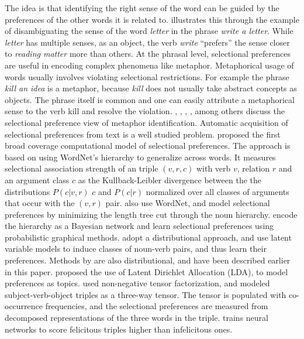 The idea is that identifying the right sense of the word can be guided by the 
preferences of the other words it is related to.  \cite{resnik1997selectional}
illustrates this through the example of disambiguating the sense of the word 
\textit{letter} in the phrase \textit{write a letter}.
While \textit{letter} has multiple senses, as an object, the verb \textit{write} 
``prefers'' the sense closer to \textit{reading matter} more than others.
At the phrasal level, selectional preferences are useful in encoding complex 
phenomena like metaphor.  Metaphorical usage of words usually involves violating 
selectional restrictions.
For example the phrase \textit{kill an idea} is a metaphor, because 
\textit{kill} does not usually take abstract concepts as objects.  The phrase 
itself is common and
one can easily attribute a metaphorical sense to the verb kill and resolve the 
violation.  \cite{wilks2007making}, \cite{wilks2007preferential}, 
\cite{krishnakumaran2007hunting},
\cite{shutova2013statistical}, among others discuss the selectional preference 
view of metaphor identification.
Automatic acquisition of selectional preferences from text is a well studied 
problem.  \cite{resnik1996selectional} proposed the first broad coverage 
computational model of selectional preferences.  The approach is based on using 
WordNet's hierarchy to generalize across words.
It measures selectional association strength of an triple $(v, r, c)$ with verb 
$v$, relation $r$ and an argument class $c$ as the Kullback-Leibler divergence 
between the the distributions $P(c|v, r)$  $c$
and $P(c|r)$ normalized over all classes of arguments that occur with the $(v, 
r)$ pair.  \cite{abe1996learning} also use WordNet, and model selectional 
preferences by minimizing the length tree cut through
the noun hierarchy.  \cite{ciaramita2000explaining} encode the hierarchy as a 
Bayesian network and learn selectional preferences using probabilistic graphical 
methods.
\cite{rooth1999inducing} adopt a distributional approach, and use latent variable 
models to induce classes of noun-verb pairs, and thus learn their preferences.  
Methods by \cite{erk2007simple,erk2010flexible}
are also distributional, and have been described earlier in this paper.  
\cite{seaghdha2010latent} proposed the use of Latent Dirichlet Allocation (LDA), 
to model preferences as topics.  \cite{van2009non} used
non-negative tensor factorization, and modeled subject-verb-object triples as a 
three-way tensor.  The tensor is populated with co-occurrence frequencies, and 
the selectional preferences are measured from decomposed
representations of the three words in the triple. \cite{van2014neural} trains 
neural networks to score felicitous triples higher than infelicitous ones.

